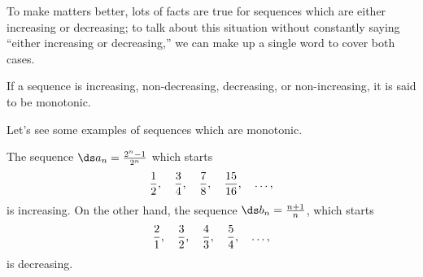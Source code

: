 \documentclass{ximera}
\renewcommand{\index}[1]{}
\begin{document}
To make matters better, lots of facts are true for sequences which are
either increasing or decreasing; to talk about this situation without
constantly saying ``either increasing or decreasing,'' we can make up
a single word to cover both cases.
\begin{definition}
  If a sequence is increasing, non-decreasing, decreasing, or
  non-increasing, it is said to be {\dfont
    monotonic\index{sequence!monotonic}\/}.
\end{definition}


Let's see some examples of sequences which are monotonic.
\begin{example}
The sequence $\ds a_n = {2^n-1\over2^n}$ which starts
$$
  {1\over2},\quad {3\over4},\quad {7\over8},\quad {15\over16},\quad \ldots,
$$
is increasing.  On the other hand, the sequence $\ds b_n = {n+1\over n}$, which starts
$$ 
  {2\over1},\quad{3\over2},\quad{4\over3},\quad{5\over4},\quad\ldots,
$$
is decreasing.
\end{example}
\end{document}
